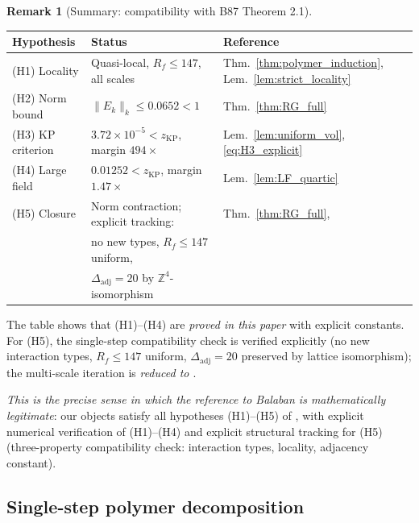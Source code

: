 \documentclass[11pt,a4paper]{amsart}
\theoremstyle{definition}
\newtheorem{remark}[theorem]{Remark}
\newcommand{\Z}{\mathbb{Z}}
\begin{document}
\begin{remark}[Summary: compatibility with B87 Theorem 2.1]
\label{rem:H_summary}
\begin{center}
\begin{tabular}{lll}
\hline
Hypothesis & Status & Reference \\
\hline
(H1) Locality        & Quasi-local, $R_f \le 147$, all scales  & Thm.~\ref{thm:polymer_induction}, Lem.~\ref{lem:strict_locality} \\
(H2) Norm bound      & $\|E_k\|_k \le 0.0652 < 1$            & Thm.~\ref{thm:RG_full} \\
(H3) KP criterion    & $3.72\times10^{-5} < z_{\mathrm{KP}}$, margin $494\times$ & Lem.~\ref{lem:uniform_vol}, \eqref{eq:H3_explicit} \\
(H4) Large field     & $0.01252 < z_{\mathrm{KP}}$, margin $1.47\times$ & Lem.~\ref{lem:LF_quartic} \\
(H5) Closure         & Norm contraction; explicit tracking:                & Thm.~\ref{thm:RG_full}, \cite{B87} \\
                     & no new types, $R_f \le 147$ uniform,                &  \\
                     & $\Delta_{\mathrm{adj}} = 20$ by $\Z^4$-isomorphism  &  \\
\hline
\end{tabular}
\end{center}

The table shows that (H1)--(H4) are \emph{proved in this paper} with explicit constants.
For (H5), the single-step compatibility check is verified explicitly (no new interaction
types, $R_f \le 147$ uniform, $\Delta_{\mathrm{adj}} = 20$ preserved by lattice isomorphism);
the multi-scale iteration is \emph{reduced to \cite[Thm.~2.1]{B87}}.

\emph{This is the precise sense in which the reference to Balaban is mathematically legitimate}:
our objects satisfy all hypotheses (H1)--(H5) of \cite[Thm.~2.1]{B87}, with explicit
numerical verification of (H1)--(H4) and explicit structural tracking for (H5)
(three-property compatibility check: interaction types, locality, adjacency constant).
\end{remark}

\subsection{Single-step polymer decomposition}
\label{sec:single_step_polymer}
\end{document}
